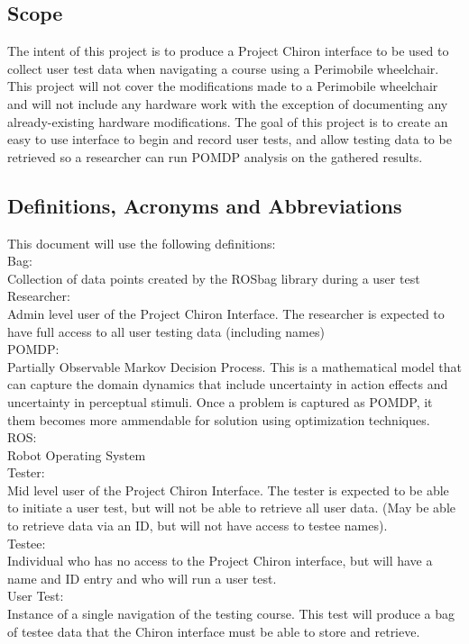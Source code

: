 \documentclass[onecolumn, draftclsnofoot,10pt, compsoc]{IEEEtran}
\begin{document}
\subsection{Scope}
The intent of this project is to produce a Project Chiron interface to be used to collect user test data when navigating a course using a Perimobile wheelchair. This project will not cover the modifications made to a Perimobile wheelchair and will not include any hardware work with the exception of documenting any already-existing hardware modifications. The goal of this project is to create an easy to use interface to begin and record user tests, and allow testing data to be retrieved so a researcher can run POMDP analysis on the gathered results.
\subsection{Definitions, Acronyms and Abbreviations}
This document will use the following definitions:\\
Bag:\\ Collection of data points created by the ROSbag library during a user test\\
Researcher:\\ Admin level user of the Project Chiron Interface. The researcher is expected to have full access to all user testing data (including names)\\
POMDP:\\ Partially Observable Markov Decision Process. This is a mathematical model that can capture the domain dynamics that include uncertainty in action effects and uncertainty in perceptual stimuli. Once a problem is captured as POMDP, it them becomes more ammendable for solution using optimization techniques. \cite{1}
ROS:\\ Robot Operating System\\
Tester:\\ Mid level user of the Project Chiron Interface. The tester is expected to be able to initiate a user test, but will not be able to retrieve all user data. (May be able to retrieve data via an ID, but will not have access to testee names).\\
Testee:\\ Individual who has no access to the Project Chiron interface, but will have a name and ID entry and who will run a user test.\\
User Test:\\ Instance of a single navigation of the testing course. This test will produce a bag of testee data that the Chiron interface must be able to store and retrieve.\\
\end{document}
